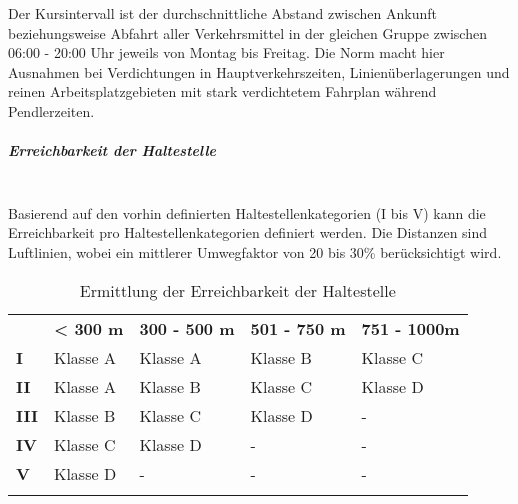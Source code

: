 Der Kursintervall ist der durchschnittliche Abstand zwischen Ankunft beziehungsweise Abfahrt aller Verkehrsmittel in der gleichen Gruppe zwischen 06:00 - 20:00 Uhr jeweils von Montag bis Freitag.
Die Norm macht hier Ausnahmen bei Verdichtungen in Hauptverkehrszeiten, Linienüberlagerungen und reinen Arbeitsplatzgebieten mit stark verdichtetem Fahrplan während Pendlerzeiten.

\subparagraph{Erreichbarkeit der Haltestelle}~\\
\label{Definition ÖV-Güteklassen:Erreichbarkeit der Haltestelle}
Basierend auf den vorhin definierten Haltestellenkategorien (I bis V) kann die Erreichbarkeit pro Haltestellenkategorien definiert werden.
Die Distanzen sind Luftlinien, wobei ein mittlerer Umwegfaktor von 20 bis 30\% berücksichtigt wird.

\begin{longtable}[c]{l p{3.3cm} p{3.3cm} p{3.3cm} p{3.3cm}}
        \midrule
        \textbf{}
                                & \textbf{< 300 m}
                                & \textbf{300 - 500 m}
                                & \textbf{501 - 750 m}
                                & \textbf{751 - 1000m}\\
        \textbf{I}
                                & Klasse A
                                & Klasse A
                                & Klasse B
                                & Klasse C\\
        \textbf{II}
                                & Klasse A
                                & Klasse B
                                & Klasse C
                                & Klasse D\\
        \textbf{III}
                                & Klasse B
                                & Klasse C
                                & Klasse D
                                & -\\
        \textbf{IV}
                                & Klasse C
                                & Klasse D
                                & -
                                & -\\
        \textbf{V}
                                & Klasse D
                                & -
                                & -
                                & -\\
        \bottomrule
    \caption{Ermittlung der Erreichbarkeit der Haltestelle}
    \label{table:Ermittlung Erreichbarkeit der Haltestelle}
\end{longtable}

